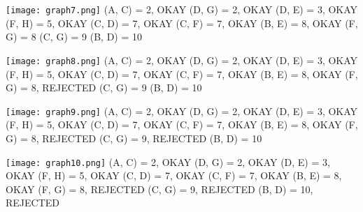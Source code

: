 \documentclass{article}
\begin{document}
\texttt{[image: graph7.png]}
\newline
(A, C) = 2, OKAY
\newline
(D, G) = 2, OKAY
\newline
(D, E) = 3, OKAY
\newline
(F, H) = 5, OKAY
\newline
(C, D) = 7, OKAY
\newline
(C, F) = 7, OKAY
\newline
(B, E) = 8, OKAY
\newline
(F, G) = 8
\newline
(C, G) = 9
\newline
(B, D) = 10

\texttt{[image: graph8.png]}
\newline
(A, C) = 2, OKAY
\newline
(D, G) = 2, OKAY
\newline
(D, E) = 3, OKAY
\newline
(F, H) = 5, OKAY
\newline
(C, D) = 7, OKAY
\newline
(C, F) = 7, OKAY
\newline
(B, E) = 8, OKAY
\newline
(F, G) = 8, REJECTED
\newline
(C, G) = 9
\newline
(B, D) = 10

\texttt{[image: graph9.png]}
\newline
(A, C) = 2, OKAY
\newline
(D, G) = 2, OKAY
\newline
(D, E) = 3, OKAY
\newline
(F, H) = 5, OKAY
\newline
(C, D) = 7, OKAY
\newline
(C, F) = 7, OKAY
\newline
(B, E) = 8, OKAY
\newline
(F, G) = 8, REJECTED
\newline
(C, G) = 9, REJECTED
\newline
(B, D) = 10

\texttt{[image: graph10.png]}
\newline
(A, C) = 2, OKAY
\newline
(D, G) = 2, OKAY
\newline
(D, E) = 3, OKAY
\newline
(F, H) = 5, OKAY
\newline
(C, D) = 7, OKAY
\newline
(C, F) = 7, OKAY
\newline
(B, E) = 8, OKAY
\newline
(F, G) = 8, REJECTED
\newline
(C, G) = 9, REJECTED
\newline
(B, D) = 10, REJECTED
\end{document}
